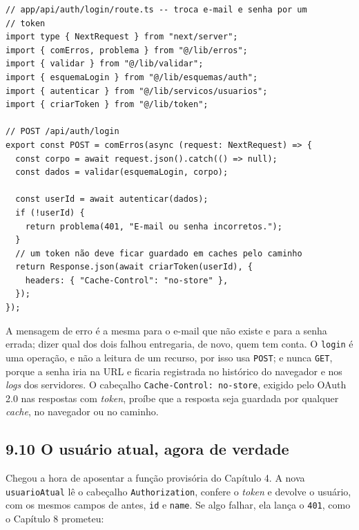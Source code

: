 \begin{codigo}
\begin{Verbatim}[breaklines=true, breaksymbolleft={}, fontsize=\footnotesize]
// app/api/auth/login/route.ts -- troca e-mail e senha por um
// token
import type { NextRequest } from "next/server";
import { comErros, problema } from "@/lib/erros";
import { validar } from "@/lib/validar";
import { esquemaLogin } from "@/lib/esquemas/auth";
import { autenticar } from "@/lib/servicos/usuarios";
import { criarToken } from "@/lib/token";

// POST /api/auth/login
export const POST = comErros(async (request: NextRequest) => {
  const corpo = await request.json().catch(() => null);
  const dados = validar(esquemaLogin, corpo);

  const userId = await autenticar(dados);
  if (!userId) {
    return problema(401, "E-mail ou senha incorretos.");
  }
  // um token não deve ficar guardado em caches pelo caminho
  return Response.json(await criarToken(userId), {
    headers: { "Cache-Control": "no-store" },
  });
});
\end{Verbatim}
\end{codigo}

A mensagem de erro é a mesma para o e-mail que não existe e para a senha errada; dizer qual dos dois falhou entregaria, de novo, quem tem conta. O \texttt{login} é uma operação, e não a leitura de um recurso, por isso usa \texttt{POST}; e nunca \texttt{GET}, porque a senha iria na URL e ficaria registrada no histórico do navegador e nos \textit{logs} dos servidores. O cabeçalho \texttt{Cache-Control: no-store}, exigido pelo OAuth 2.0 nas respostas com \textit{token}, proíbe que a resposta seja guardada por qualquer \textit{cache}, no navegador ou no caminho.

\subsection{9.10 O usuário atual, agora de verdade}

Chegou a hora de aposentar a função provisória do Capítulo 4. A nova \texttt{usuarioAtual} lê o cabeçalho \texttt{Authorization}, confere o \textit{token} e devolve o usuário, com os mesmos campos de antes, \texttt{id} e \texttt{name}. Se algo falhar, ela lança o \texttt{401}, como o Capítulo 8 prometeu:

